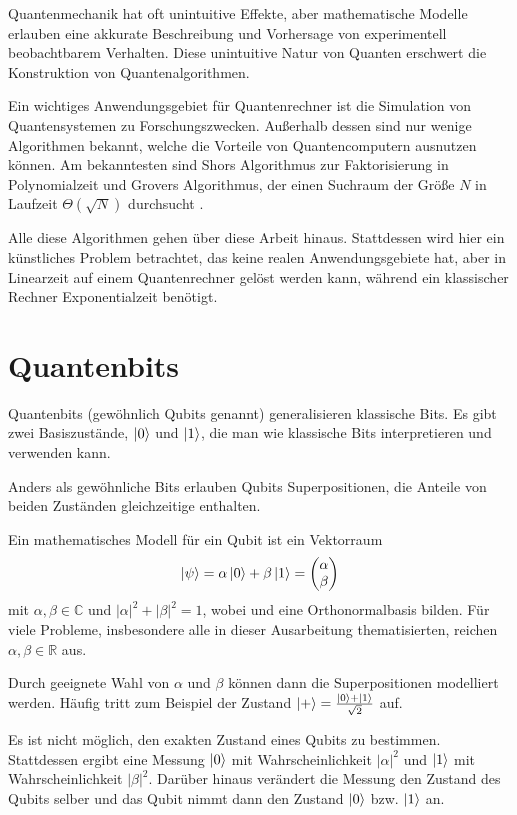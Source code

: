 \documentclass{acm_proc_article-sp}
\begin{document}
Quantenmechanik hat oft unintuitive Effekte, aber mathematische Modelle erlauben
eine akkurate Beschreibung und Vorhersage von experimentell beobachtbarem Verhalten.
Diese unintuitive Natur von Quanten erschwert die Konstruktion von Quantenalgorithmen.

Ein wichtiges Anwendungsgebiet für Quantenrechner ist die Simulation von
Quantensystemen zu Forschungszwecken. \linebreak
Außerhalb dessen sind nur wenige Algorithmen bekannt, welche die Vorteile von Quantencomputern ausnutzen können. 
Am bekanntesten sind Shors Algorithmus zur Faktorisierung in Polynomialzeit und Grovers Algorithmus, der
einen Suchraum der Größe $N$ in Laufzeit $\Theta(\sqrt N)$ durchsucht \cite{Nielsen}.

Alle diese Algorithmen gehen über diese Arbeit hinaus. Stattdessen wird hier ein künstliches Problem betrachtet, das
keine realen Anwendungsgebiete hat, aber in Linearzeit auf einem Quantenrechner gelöst werden kann, während ein
klassischer Rechner Exponentialzeit benötigt.

\section{Quantenbits}

Quantenbits (gewöhnlich Qubits genannt) generalisieren klassische Bits.
Es gibt zwei Basiszustände, $\left|0\right\rangle$ und $\left|1\right\rangle$, die man wie klassische Bits interpretieren und verwenden kann.

Anders als gewöhnliche Bits erlauben Qubits Superpositionen, die Anteile von beiden Zuständen gleichzeitige enthalten.

Ein mathematisches Modell für ein Qubit ist ein Vektorraum
    \[\left|\psi\right\rangle = \alpha \left|0\right\rangle + \beta \left|1\right\rangle =
    \begin{pmatrix}
        \alpha \\ \beta
    \end{pmatrix}
    \]
mit  \(\alpha, \beta \in \mathbb C \) und $|\alpha|^2 + |\beta|^2 = 1$, wobei  und  eine Orthonormalbasis bilden.
Für viele Probleme, insbesondere alle in dieser Ausarbeitung thematisierten, reichen \(\alpha, \beta \in \mathbb R \) aus.

Durch geeignete Wahl von $\alpha$ und $\beta$ können dann die Superpositionen modelliert werden.
Häufig tritt zum Beispiel der Zustand $\left|+\right\rangle = \frac{\left|0\right\rangle + \left|1\right\rangle}{\sqrt 2}$ auf.

Es ist nicht möglich, den exakten Zustand eines Qubits zu bestimmen.
Stattdessen ergibt eine Messung $\left|0\right\rangle$ mit Wahrscheinlichkeit $|\alpha|^2$ und
$\left|1\right\rangle$ mit Wahrscheinlichkeit $|\beta|^2$.
Darüber hinaus verändert die Messung den Zustand des Qubits selber und
das Qubit nimmt dann den Zustand $\left|0\right\rangle$ bzw. $\left|1\right\rangle$ an.
\end{document}
